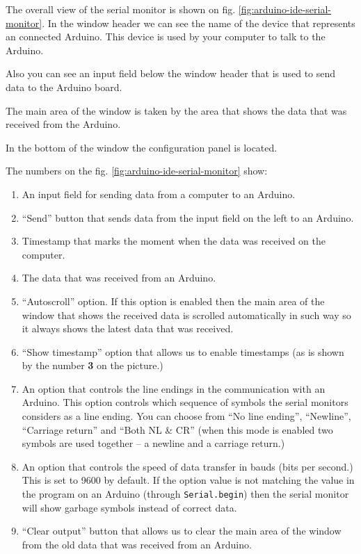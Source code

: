 \documentclass[../sparc.tex]{subfiles}
\begin{document}
The overall view of the serial monitor is shown on fig.
\ref{fig:arduino-ide-serial-monitor}.  In the window header we can see the name
of the device that represents an connected Arduino.  This device is used by your
computer to talk to the Arduino.

Also you can see an input field below the window header that is used to send
data to the Arduino board.

The main area of the window is taken by the area that shows the data that was
received from the Arduino.

In the bottom of the window the configuration panel is located.

The numbers on the fig. \ref{fig:arduino-ide-serial-monitor} show:
\begin{enumerate}
\item An input field for sending data from a computer to an Arduino.
\item ``Send'' button that sends data from the input field on the left to an
  Arduino.
\item Timestamp that marks the moment when the data was received on the
  computer.
\item The data that was received from an Arduino.
\item ``Autoscroll'' option.  If this option is enabled then the main area of
  the window that shows the received data is scrolled automatically in such way
  so it always shows the latest data that was received.
\item ``Show timestamp'' option that allows us to enable timestamps (as is shown
  by the number \textbf{3} on the picture.)
\item An option that controls the line endings in the communication with an
  Arduino.  This option controls which sequence of symbols the serial monitors
  considers as a line ending.  You can choose from ``No line ending'',
  ``Newline'', ``Carriage return'' and ``Both NL \& CR'' (when this mode is
  enabled two symbols are used together -- a newline and a carriage return.)
\item An option that controls the speed of data transfer in bauds (bits per
  second.)  This is set to 9600 by default.  If the option value is not matching
  the value in the program on an Arduino (through \texttt{Serial.begin}) then
  the serial monitor will show garbage symbols instead of correct data.
\item ``Clear output'' button that allows us to clear the main area of the
  window from the old data that was received from an Arduino.
\end{enumerate}
\end{document}
